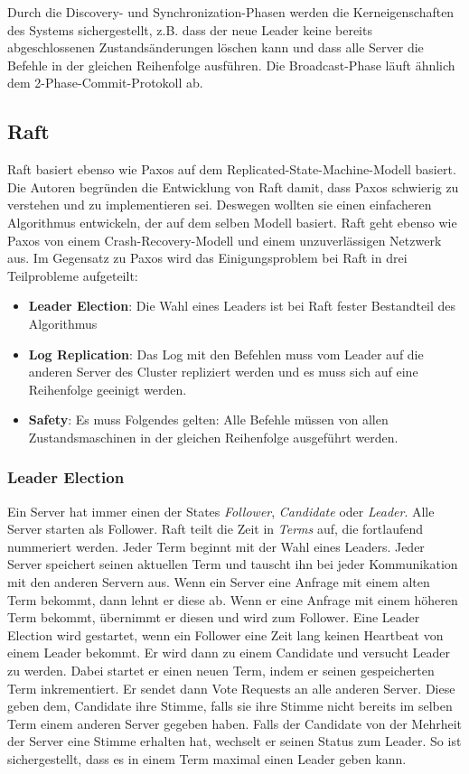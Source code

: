 Durch die Discovery- und Synchronization-Phasen werden die Kerneigenschaften des Systems sichergestellt, z.B. dass der neue Leader keine bereits abgeschlossenen Zustandsänderungen löschen kann und dass alle Server die Befehle in der gleichen Reihenfolge ausführen. Die Broadcast-Phase läuft ähnlich dem 2-Phase-Commit-Protokoll \cite{pc} ab.

\subsection{Raft}

Raft \cite{raft, raft-thesis} basiert ebenso wie Paxos auf dem Replicated-State-Machine-Modell basiert. Die Autoren begründen die Entwicklung von Raft damit, dass Paxos schwierig zu verstehen und zu implementieren sei. Deswegen wollten sie einen einfacheren Algorithmus entwickeln, der auf dem selben Modell basiert. Raft geht ebenso wie Paxos von einem Crash-Recovery-Modell und einem unzuverlässigen Netzwerk aus.
Im Gegensatz zu Paxos wird das Einigungsproblem bei Raft in drei Teilprobleme aufgeteilt:
\begin{itemize}
	\item \textbf{Leader Election}: Die Wahl eines Leaders ist bei Raft fester Bestandteil des Algorithmus 
	\item \textbf{Log Replication}: Das Log mit den Befehlen muss vom Leader auf die anderen Server des Cluster repliziert werden und es muss sich auf eine Reihenfolge geeinigt werden.
	\item \textbf{Safety}: Es muss Folgendes gelten: Alle Befehle müssen von allen Zustandsmaschinen in der gleichen Reihenfolge ausgeführt werden.
\end{itemize}

\subsubsection{Leader Election}

Ein Server hat immer einen der States \textit{Follower}, \textit{Candidate} oder \textit{Leader}. Alle Server starten als Follower. Raft teilt die Zeit in \textit{Terms} auf, die fortlaufend nummeriert werden. Jeder Term beginnt mit der Wahl eines Leaders. Jeder Server speichert seinen aktuellen Term und tauscht ihn bei jeder Kommunikation mit den anderen Servern aus. Wenn ein Server eine Anfrage mit einem alten Term bekommt, dann lehnt er diese ab. Wenn er eine Anfrage mit einem höheren Term bekommt, übernimmt er diesen und wird zum Follower. Eine Leader Election wird gestartet, wenn ein Follower eine Zeit lang keinen Heartbeat von einem Leader bekommt. Er wird dann zu einem Candidate und versucht Leader zu werden. Dabei startet er einen neuen Term, indem er seinen gespeicherten Term inkrementiert. Er sendet dann Vote Requests an alle anderen Server. Diese geben dem, Candidate ihre Stimme, falls sie ihre Stimme nicht bereits im selben Term einem anderen Server gegeben haben. Falls der Candidate von der Mehrheit der Server eine Stimme erhalten hat, wechselt er seinen Status zum Leader. So ist sichergestellt, dass es in einem Term maximal einen Leader geben kann. 

